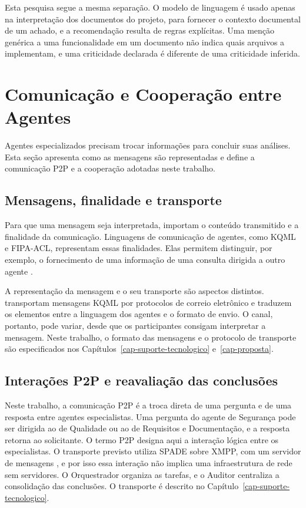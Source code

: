 Esta pesquisa segue a mesma separação. O modelo de linguagem é usado apenas na interpretação dos documentos do projeto, para fornecer o contexto documental de um achado, e a recomendação resulta de regras explícitas. Uma menção genérica a uma funcionalidade em um documento não indica quais arquivos a implementam, e uma criticidade declarada é diferente de uma criticidade inferida.

\section{Comunicação e Cooperação entre Agentes}
\label{rt-2-4}

Agentes especializados precisam trocar informações para concluir suas análises. Esta seção apresenta como as mensagens são representadas e define a comunicação P2P e a cooperação adotadas neste trabalho.

\subsection{Mensagens, finalidade e transporte}
\label{rt-2-4-1}

Para que uma mensagem seja interpretada, importam o conteúdo transmitido e a finalidade da comunicação. Linguagens de comunicação de agentes, como KQML e FIPA-ACL, representam essas finalidades. Elas permitem distinguir, por exemplo, o fornecimento de uma informação de uma consulta dirigida a outro agente \cite{finin1994,fipaACL2002,lazarin2025}.

A representação da mensagem e o seu transporte são aspectos distintos.  transportam mensagens KQML por protocolos de correio eletrônico e traduzem os elementos entre a linguagem dos agentes e o formato de envio. O canal, portanto, pode variar, desde que os participantes consigam interpretar a mensagem. Neste trabalho, o formato das mensagens e o protocolo de transporte são especificados nos Capítulos~\ref{cap-suporte-tecnologico} e~\ref{cap-proposta}.

\subsection{Interações P2P e reavaliação das conclusões}
\label{rt-2-4-2}

Neste trabalho, a comunicação P2P é a troca direta de uma pergunta e de uma resposta entre agentes especialistas. Uma pergunta do agente de Segurança pode ser dirigida ao de Qualidade ou ao de Requisitos e Documentação, e a resposta retorna ao solicitante. %
O termo P2P designa aqui a interação lógica entre os especialistas. O transporte previsto utiliza SPADE sobre XMPP, com um servidor de mensagens \cite{spadeDocs,rfc6120}, e por isso essa interação não implica uma infraestrutura de rede sem servidores. O Orquestrador organiza as tarefas, e o Auditor centraliza a consolidação das conclusões. O transporte é descrito no Capítulo~\ref{cap-suporte-tecnologico}.

